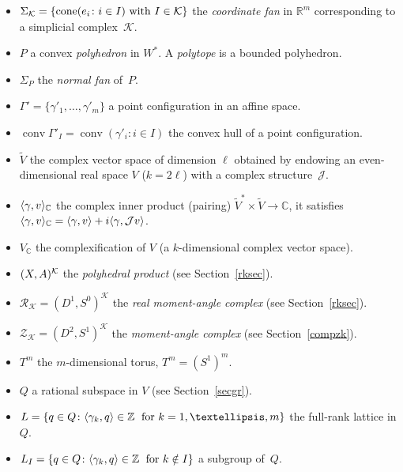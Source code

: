 \documentclass[a4paper]{amsart}
\theoremstyle{definition}
\theoremstyle{remark}
\numberwithin{equation}{section}
\def\R{\mathbb R}
\def\C{\mathbb C}
\def\R{\mathbb R}
\def\Z{\mathbb Z}
\def\sK{\mathcal K}
\newcommand{\mb}[1]{{\textbf {\textit#1}}}
\def\cone{\mathop{\mathrm{cone}}}
\def\conv{\mathop{\mathrm{conv}}}
\def\rk{\mathcal R_{\mathcal K}}
\newcommand{\zk}{\mathcal Z_{\mathcal K}}
\newcommand{\<}{\langle}
\renewcommand{\>}{\rangle}
\begin{document}
\begin{itemize}
\item
$\Sigma_\sK=\{\cone(\mb e_i\colon i\in I)\text{ with }I\in\sK\}$ the \emph{coordinate fan} in $\R^m$ corresponding to a simplicial complex~$\sK$.

\item
$P$ a convex \emph{polyhedron} in $W^*$. A \emph{polytope} is a bounded polyhedron.

\item
$\Sigma_P$ the \emph{normal fan} of~$P$.

\item
$\Gamma'=\{\gamma'_1,\ldots,\gamma'_m\}$ a point configuration in an affine space.

\item
$\conv\Gamma'_I=\conv(\gamma'_i\colon i\in I)$ the convex hull of a point configuration.

\item
$\widetilde V$ the complex vector space of dimension $\ell$ obtained by endowing an even-dimensional real space $V$ ($k=2\ell$) with a complex structure~$\mathcal J$.

\item
$\langle\gamma,\mb v\rangle_\C$ the complex inner product (pairing) 
$\widetilde V^*\times\widetilde V\to\C$, it satisfies
$\langle\gamma,\mb v\rangle_\C=\langle\gamma,\mb v\rangle+
  i\langle\gamma,\mathcal J\mb v\rangle$.

\item
$V_\C$ the complexification of $V$ (a $k$-dimensional complex vector space).

\item
$(\mb X,\mb A)^\sK$ the \emph{polyhedral product} (see Section~\ref{rksec}).

\item
$\rk=(D^1,S^0)^\sK$ the \emph{real moment-angle complex} (see Section~\ref{rksec}).

\item
$\zk=(D^2,S^1)^\sK$ the \emph{moment-angle complex} (see Section~\ref{compzk}).

\item
$T^m$ the $m$-dimensional torus, $T^m=(S^1)^m$.

\item
$Q$ a rational subspace in $V$ (see Section~\ref{secgr}).

\item
$L=\{\mb q\in Q\colon\langle\gamma_k,\mb q\rangle\in\Z\;
  \text{ for }k=1,\ldots,m\}$ the full-rank lattice in $Q$.
  
\item
$L_I=\{\mb q\in Q\colon\langle\gamma_k,\mb q\rangle\in\Z\;\text{ for }k\notin I\}$ a subgroup of~$Q$.


\end{itemize}
\end{document}
